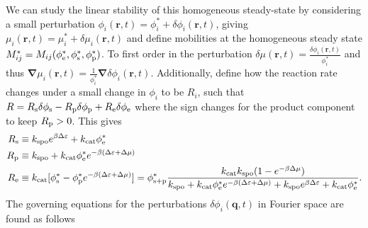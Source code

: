 We can study the linear stability of this homogeneous steady-state by considering a small perturbation $\phi_i(\bm{r},t) = \phi_i^* + \delta\phi_i(\bm{r}, t)$, giving $\mu_i(\bm{r},t) = \mu_i^* + \delta\mu_i(\bm{r},t)$ and define mobilities at the homogeneous steady state $M^*_{ij} = M_{ij}(\phi_{\mathrm{e}}^*, \phi_{\mathrm{s}}^*, \phi_{\mathrm{p}}^*)$. To first order in the perturbation $\delta\mu(\bm{r},t) = \frac{\delta\phi_i(\bm{r},t)}{\phi_i^*}$ and thus $\bm{\nabla}\mu_i(\bm{r},t) = \frac{1}{\phi_i^*}\bm{\nabla}\delta\phi_i(\bm{r},t)$. Additionally, define how the reaction rate changes under a small change in $\phi_i$ to be $R_i$, such that $R = R_\mathrm{s} \delta \phi_{\mathrm{s}} - R_\mathrm{p} \delta \phi_{\mathrm{p}} + R_\mathrm{e} \delta \phi_{\mathrm{e}}$ where the sign changes for the product component to keep $R_\mathrm{p} > 0$. This gives
\begin{align}
    R_\mathrm{s} &\equiv k_{\mathrm{spo}} e^{\beta \Delta \varepsilon} + k_{\mathrm{cat}}\phi_{\mathrm{e}}^* \\
    R_\mathrm{p} &\equiv k_{\mathrm{spo}} + k_{\mathrm{cat}}\phi_{\mathrm{e}}^*e^{-\beta (\Delta \varepsilon+\Delta \mu)} \\
    R_\mathrm{e} &\equiv k_\mathrm{cat} [ \phi_{\mathrm{s}}^* - \phi_{\mathrm{p}}^* e^{-\beta (\Delta \varepsilon + \Delta \mu)}] = \phi^*_\mathrm{s+p} \frac{k_\mathrm{cat} k_\mathrm{spo} (1-e^{-\beta \Delta \mu})}{k_\mathrm{spo} + k_\mathrm{cat} \phi_{\mathrm{e}}^* e^{-\beta (\Delta \varepsilon + \Delta \mu)} + k_\mathrm{spo} e^{\beta \Delta \varepsilon} + k_\mathrm{cat} \phi_{\mathrm{e}}^* }.
\end{align}
The governing equations for the perturbations $\delta\phi_i (\bm{q},t) $ in Fourier space are found as follows\\
\noindent
{}
